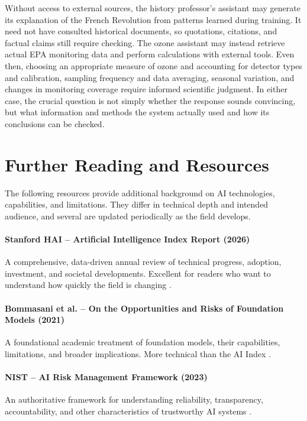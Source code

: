 \documentclass[11pt]{article}
\begin{document}
Without access to external sources, the history professor's
assistant may generate its explanation of the French Revolution
from patterns learned during training. It need not have consulted
historical documents, so quotations, citations, and factual
claims still require checking.
The ozone assistant may instead
retrieve actual EPA monitoring data and perform calculations
with external tools. Even then, choosing an appropriate measure of ozone and accounting for detector types and calibration, sampling frequency and data averaging, seasonal variation, and changes in monitoring coverage require informed scientific judgment.
In either case, the crucial question is not simply whether
the response sounds convincing, but what information and methods
the system actually used and how its conclusions can be checked.

\section{Further Reading and Resources}

The following resources provide additional background on AI technologies, capabilities, and limitations. They differ in technical depth and intended audience, and several are updated periodically as the field develops.


\paragraph{Stanford HAI -- Artificial Intelligence Index Report (2026)}
A comprehensive, data-driven annual review of technical progress, adoption, investment, and societal developments. Excellent for readers who want to understand how quickly the field is changing \citep{StanfordHAI2026Index}.

\paragraph{Bommasani et al. -- On the Opportunities and Risks of Foundation Models (2021)}
A foundational academic treatment of foundation models, their capabilities, limitations, and broader implications. More technical than the AI Index \citep{Bommasani2021}.
  
\paragraph{NIST -- AI Risk Management Framework (2023)}
  An authoritative framework for understanding reliability, transparency, accountability, and other characteristics of trustworthy AI systems \citep{NIST2023AIRMF}.
\end{document}
